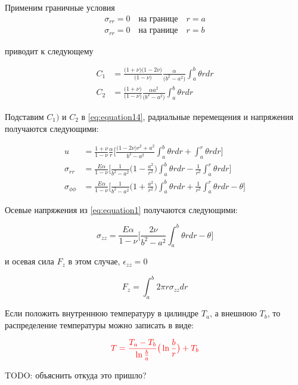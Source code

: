 Применим граничные условия
\begin{equation}
	\label{eq:equation16}
	\begin{split}
		\sigma_{rr} = 0 \quad \text{на границе} \quad r=a\\
		\sigma_{rr} = 0 \quad \text{на границе} \quad r=b
	\end{split}
\end{equation}

приводит к следующему

\begin{equation*}
	\begin{split}
		C_1 &= \frac{\big(1+\nu \big)\big(1-2\nu \big)}{\big(1-\nu \big)}  \frac{\alpha}{\big(b^2-a^2 \big)} \int_a^b \theta rdr\\
		C_2 &= \frac{\big(1+\nu \big)}{\big(1-\nu \big)}\frac{\alpha a^2}{\big(b^2-a^2 \big)}\int_a^b \theta rdr
	\end{split}
\end{equation*}

Подставим \(C_1)\) и \(C_2\) в \cref{eq:equation14}, радиальные перемещения и напряжения получаются следующими:

\begin{equation}
	\label{eq:equation17}
	\begin{split}
		u &= \frac{1+\nu}{1-\nu} \frac{\alpha}{r} \big[ \frac{\big( 1-2\nu \big) r^2 +a^2}{b^2-a^2} \int_a^b \theta rdr + \int_a^r \theta r dr\big]\\
		\sigma_{rr} &= \frac{E \alpha}{1-\nu}\big[ \frac{1}{b^2-a^2} \big(1-\frac{a^2}{r^2} \big)\int_a^b \theta rdr -\frac{1}{r^2}\int_a^r \theta r dr\big]\\
		\sigma_{\phi\phi} &= \frac{E \alpha}{1-\nu}\big[ \frac{1}{b^2-a^2}\big(1+\frac{a^2}{r^2} \big)\int_a^b \theta rdr +\frac{1}{r^2}\int_a^r \theta r dr - \theta \big]
	\end{split}
\end{equation}	
	
Осевые напряжения из \cref{eq:equation1}	получаются следующими:

\begin{equation}
	\label{eq:equation18}
	\sigma_{zz} = \frac{E \alpha}{1-\nu}\big[ \frac{2\nu}{b^2-a^2}\int_a^b \theta rdr  - \theta \big]	
\end{equation}

и осевая сила \(F_z\) в этом случае, \(\epsilon_{zz}=0\)

\begin{equation}
	\label{eq:equation19}
	F_z = \int_a^b 2 \pi r \sigma_{zz} dr
\end{equation}


Если положить внутреннюю температуру в цилиндре \(T_a\), а внешнюю \(T_b\), то распределение температуры можно записать в виде:

\begin{equation}
	\label{eq:equation20}
	{\color{red}T=\frac{T_a - T_b}{\ln{\frac{b}{a}}} \big(\ln{\frac{b}{r}} \big) + T_b}
\end{equation}

{\color{red}TODO: объяснить откуда это пришло?}
